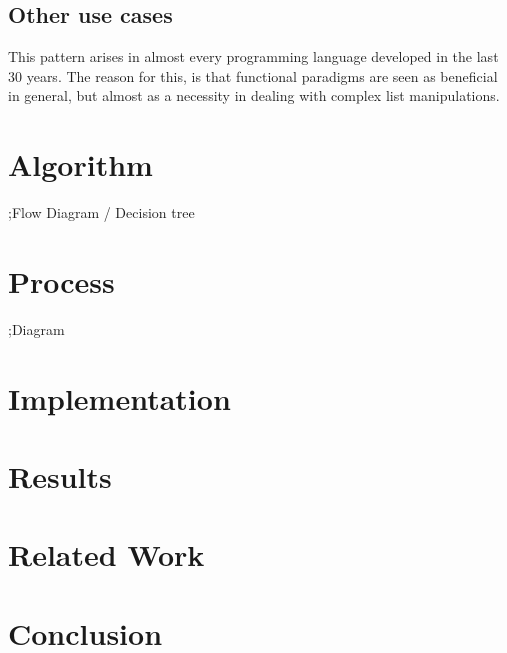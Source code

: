 \documentclass{article}
\begin{document}
\subsection{Other use cases}

  This pattern arises in almost every programming language developed in the last 30 years.  The reason for this, is that functional paradigms are seen as beneficial in general, but almost as a necessity in dealing with complex list manipulations.    

\section{Algorithm}

;Flow Diagram / Decision tree

\section{Process}

;Diagram

\section{Implementation}

\section{Results}

\section{Related Work}

\section{Conclusion}
\end{document}
